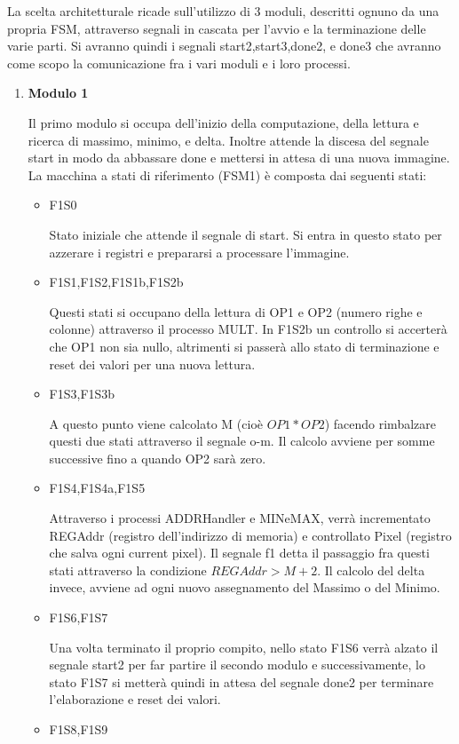 \documentclass{article}
\begin{document}
La scelta architetturale ricade sull'utilizzo di 3 moduli, descritti ognuno da una propria FSM, attraverso segnali in cascata per l'avvio e la terminazione delle varie parti. Si avranno quindi i segnali start2,start3,done2, e done3 che avranno come scopo la comunicazione fra i vari moduli e i loro processi.
 \begin{enumerate} 
  \item \textbf{Modulo 1} 
  
  Il primo modulo si occupa dell'inizio della computazione, della lettura e ricerca di massimo, minimo, e delta. Inoltre attende la discesa del segnale start in modo da abbassare done e mettersi in attesa di una nuova immagine. La macchina a stati di riferimento (FSM1) è composta dai seguenti stati:
  \begin{itemize}
  \item F1S0
  
  Stato iniziale che attende il segnale di start. Si entra in questo stato per azzerare i registri e prepararsi a processare l'immagine.
  
    \item F1S1,F1S2,F1S1b,F1S2b
  
  Questi stati si occupano della lettura di OP1 e OP2 (numero righe e colonne) attraverso il processo MULT. In F1S2b un controllo si accerterà che OP1 non sia nullo, altrimenti si passerà allo stato di terminazione e reset dei valori per una nuova lettura.
  \item F1S3,F1S3b
  
  A questo punto viene calcolato M (cioè \(OP1*OP2\)) facendo rimbalzare questi due stati attraverso il segnale o-m. Il calcolo avviene per somme successive fino a quando OP2 sarà zero. 
  \item F1S4,F1S4a,F1S5
  
  Attraverso i processi ADDRHandler e MINeMAX, verrà incrementato REGAddr (registro dell'indirizzo di memoria) e controllato Pixel (registro che salva ogni current pixel). Il segnale f1 detta il passaggio fra questi stati attraverso la condizione \(REGAddr > M + 2 \). Il calcolo del delta invece, avviene ad ogni nuovo assegnamento del Massimo o del Minimo.
  
  \item F1S6,F1S7
  
  Una volta terminato il proprio compito, nello stato F1S6 verrà alzato il segnale start2 per far partire il secondo modulo e successivamente, lo stato F1S7 si metterà quindi in attesa del segnale done2 per terminare l'elaborazione e reset dei valori.
  \item F1S8,F1S9
  

\end{itemize}
\end{enumerate}
\end{document}
